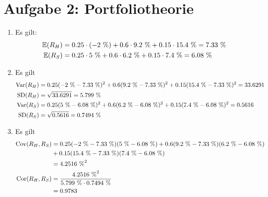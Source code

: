 \documentclass{article}
\newcommand{\E}{\mathbb{E}}
\DeclareMathOperator{\Var}{Var}
\DeclareMathOperator{\Cov}{Cov}
\DeclareMathOperator{\Cor}{Cor}
\DeclareMathOperator{\SD}{SD}
\begin{document}
	\section*{Aufgabe 2: Portfoliotheorie}
	\begin{enumerate}[label=(\alph*)]
		\item Es gilt:
		\begin{align}
			\E(R_H) &= 0.25\cdot (-2\text{ \%}) + 0.6\cdot 9.2\text{ \%} + 0.15\cdot 15.4\text{ \%} = 7.33\text{ \%} \notag \\
			\E(R_S) &= 0.25\cdot 5\text{ \%} + 0.6\cdot 6.2\text{ \%} + 0.15\cdot 7.4\text{ \%} = 6.08\text{ \%} \notag
		\end{align}
		\item Es gilt
		\begin{align}
			\Var(R_H) &= 0.25(-2\text{ \%} - 7.33\text{ \%})^2 + 0.6(9.2\text{ \%} - 7.33\text{ \%})^2 + 0.15(15.4\text{ \%} - 7.33\text{ \%})^2 = 33.6291 \notag \\
			\SD(R_H) &= \sqrt{33.6291} = 5.799\text{ \%} \notag \\
			\Var(R_S) &= 0.25(5\text{ \%} - 6.08\text{ \%})^2 + 0.6(6.2\text{ \%} - 6.08\text{ \%})^2 + 0.15(7.4\text{ \%} - 6.08\text{ \%})^2 = 0.5616 \notag \\
			\SD(R_S) &= \sqrt{0.5616} = 0.7494\text{ \%} \notag
		\end{align}
		\item Es gilt
		\begin{align}
			\Cov(R_H,R_S) &= 0.25(-2\text{ \%} - 7.33\text{ \%})(5\text{ \%} - 6.08\text{ \%}) +  0.6(9.2\text{ \%} - 7.33\text{ \%})(6.2\text{ \%} - 6.08\text{ \%}) \notag \\
			& + 0.15(15.4\text{ \%} - 7.33\text{ \%})(7.4\text{ \%} - 6.08\text{ \%}) \notag \\
			&= 4.2516\text{ \%}^2 \notag \\
			\Cor(R_H,R_S) &= \frac{4.2516\text{ \%}^2}{5.799\text{ \%}\cdot 0.7494\text{ \%}} \notag \\
			&= 0.9783 \notag
		\end{align}
	\end{enumerate}
	
\end{document}
